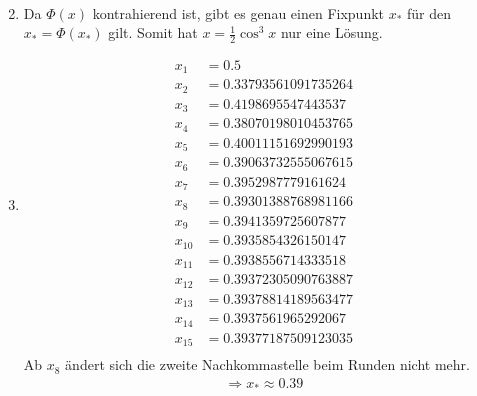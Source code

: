 \documentclass[fleqn,12pt]{scrartcl}
\begin{document}
\begin{enumerate}
\begin{align*}
		\end{align*}
	\item Da $\Phi(x)$ kontrahierend ist, gibt es genau einen Fixpunkt $x_*$ für den $x_*=\Phi(x_*)$ gilt. Somit hat $x = \frac12 \cos^3 x$ nur eine Lösung.
\item
				\begin{align*}
					x_1&=0.5\\
					x_2&=0.33793561091735264\\
					x_3&=0.4198695547443537\\
					x_4&=0.38070198010453765\\
					x_5&=0.40011151692990193\\
					x_6&=0.39063732555067615\\
					x_7&=0.3952987779161624\\
					x_8&=0.39301388768981166\\
					x_9&=0.3941359725607877\\
					x_10&=0.3935854326150147\\
					x_11&=0.3938556714333518\\
					x_12&=0.39372305090763887\\
					x_13&=0.39378814189563477\\
					x_14&=0.3937561965292067\\
					x_15&=0.39377187509123035\\
\end{align*}
Ab $x_8$ ändert sich die zweite Nachkommastelle beim Runden nicht mehr.
\begin{align*}
	\Rightarrow x_* \approx 0.39
\end{align*}

\end{enumerate}
\end{document}
